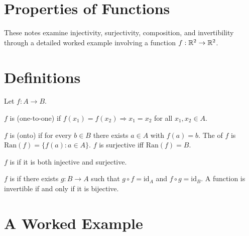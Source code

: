 \section{Properties of Functions}

These notes examine injectivity, surjectivity, composition, and invertibility
through a detailed worked example involving a function $f : \mathbb{R}^{2} \to \mathbb{R}^{2}$.

\section{Definitions}

Let $f : A \to B$.

\begin{definition}
$f$ is  (one-to-one) if $f(x_1) = f(x_2) \Rightarrow x_1 = x_2$
for all $x_1, x_2 \in A$.
\end{definition}

\begin{definition}
$f$ is  (onto) if for every $b \in B$ there exists $a \in A$
with $f(a) = b$. The  of $f$ is $\mathrm{Ran}(f) = \{f(a) : a \in A\}$.
$f$ is surjective iff $\mathrm{Ran}(f) = B$.
\end{definition}

\begin{definition}
$f$ is  if it is both injective and surjective.
\end{definition}

\begin{definition}
$f$ is  if there exists $g : B \to A$ such that $g \circ f = \mathrm{id}_A$
and $f \circ g = \mathrm{id}_B$. A function is invertible if and only if it is
bijective.
\end{definition}

\section{A Worked Example}

